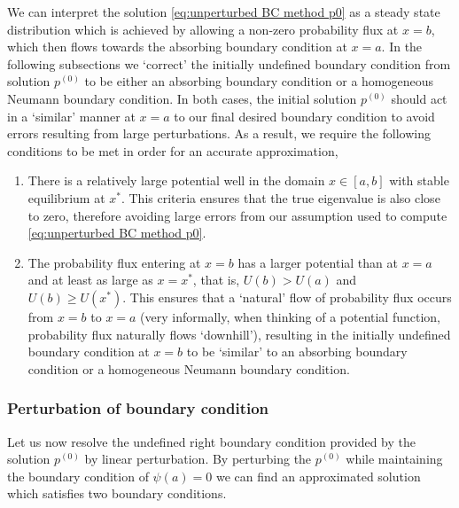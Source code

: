 \documentclass[11pt]{amsart}
\begin{document}
We can interpret the solution \cref{eq:unperturbed BC method p0} as a steady state distribution which is achieved by allowing a non-zero probability flux at $x=b$, which then flows towards the absorbing boundary condition at $x=a$. In the following subsections we `correct' the initially undefined boundary condition from solution $p^{(0)}$ to be either an absorbing boundary condition or a homogeneous Neumann boundary condition. In both cases, the initial solution $p^{(0)}$ should act in a `similar' manner at $x=a$ to our final desired boundary condition to avoid errors resulting from large perturbations. As a result, we require the following conditions to be met in order for an accurate approximation,
\begin{enumerate}
    \item There is a relatively large potential well in the domain $x\in [a,b]$ with stable equilibrium at $x^*$. This criteria ensures that the true eigenvalue is also close to zero, therefore avoiding large errors from our assumption used to compute \cref{eq:unperturbed BC method p0}.
    \item The probability flux entering at $x=b$ has a larger potential than at $x=a$ and at least as large as $x=x^*$, that is, $U(b)>U(a)$ and $U(b)\geq U(x^*)$. This ensures that a `natural' flow of probability flux occurs from $x=b$ to $x=a$ (very informally, when thinking of a potential function, probability flux naturally flows `downhill'), resulting in the initially undefined boundary condition at $x=b$ to be `similar' to an absorbing boundary condition or a homogeneous Neumann boundary condition.
\end{enumerate}

\subsubsection*{Perturbation of boundary condition}
Let us now resolve the undefined right boundary condition provided by the solution $p^{(0)}$ by linear perturbation. By perturbing the $p^{(0)}$ while maintaining the boundary condition of $\psi(a) = 0$ we can find an approximated solution which satisfies two boundary conditions.
\end{document}
